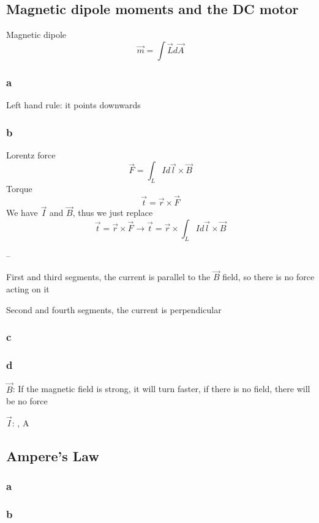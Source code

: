 \subsection{Magnetic dipole moments and the DC motor}

Magnetic dipole
\[
	\vec{m} = \int \vec{L} d\vec{A}
\]

\subsubsection{a}
Left hand rule: it points downwards

\subsubsection{b}

Lorentz force
\[
	\vec{F} = \int_L I d\vec{l} \times \vec{B}
\]
Torque
\[
	\vec{t} = \vec{r} \times \vec{F}
\]
We have \(\vec{I}\) and \(\vec{B}\), thus we just replace
\[
	\vec{t} = \vec{r} \times \vec{F}
	\to \vec{t} = \vec{r} \times \int_L I d\vec{l} \times \vec{B}
\]

--

First and third segments, the current is parallel to the \(\vec{B}\) field, so
there is no force acting on it

Second and fourth segments, the current is perpendicular


\subsubsection{c}
\subsubsection{d}

\(\vec{B}\): If the magnetic field is strong, it will turn faster, if there is
no field, there will be no force

\(\vec{I}\): , A

\subsection{Ampere's Law}

\subsubsection{a}



\subsubsection{b}
